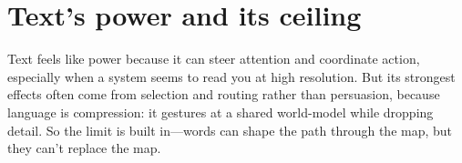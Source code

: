 \part{Text's power and its ceiling}
\epigraph{Text feels like power because it can steer attention and coordinate action, especially when a system seems to read you at high resolution. But its strongest effects often come from selection and routing rather than persuasion, because language is compression: it gestures at a shared world-model while dropping detail. So the limit is built in---words can shape the path through the map, but they can't replace the map.}{}
\clearpage
